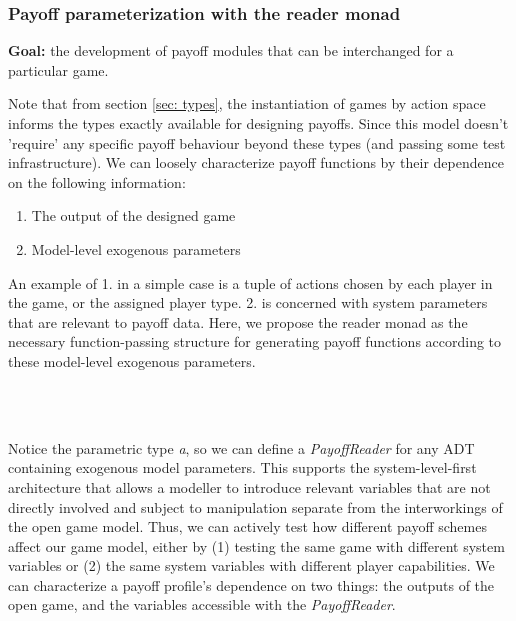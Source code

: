 \subsubsection{Payoff parameterization with the reader monad}

\textbf{Goal:} the development of payoff modules that can be interchanged for a particular game.

Note that from section \ref{sec: types}, the instantiation of games by action space informs the types exactly available for designing payoffs. Since this model doesn't 'require' any specific payoff behaviour beyond these types (and passing some test infrastructure). We can loosely characterize payoff functions by their dependence on the following information: 
\begin{enumerate}
	\item The output of the designed game 
	\item Model-level exogenous parameters 
\end{enumerate}

An example of 1. in a simple case is a tuple of actions chosen by each player in the game, or the assigned player type. 2. is concerned with system parameters that are relevant to payoff data. Here, we propose the reader monad as the necessary function-passing structure for generating payoff functions according to these model-level exogenous parameters. 

\begin{hscode}\SaveRestoreHook
	\>[B]{}\;\;\mathrel{=}\;\;\<[E]%
	\\[\blanklineskip]%
	\>[B]{}\mathbin{::}\to {}\;\to {}\<[E]%
	\\
	\>[B]{}\;\;\mathrel{=}\;\;\<[E]%
	\ColumnHook
\end{hscode}\resethooks



Notice the parametric type \textit{a}, so we can define a \textit{PayoffReader} for any ADT containing exogenous model parameters. This supports the system-level-first architecture that allows a modeller to introduce relevant variables that are not directly involved and subject to manipulation separate from the interworkings of the open game model. Thus, we can actively test how different payoff schemes affect our game model, either by (1) testing the same game with different system variables or (2) the same system variables with different player capabilities. We can characterize a payoff profile's dependence on two things: the outputs of the open game, and the variables accessible with the \textit{PayoffReader}.

